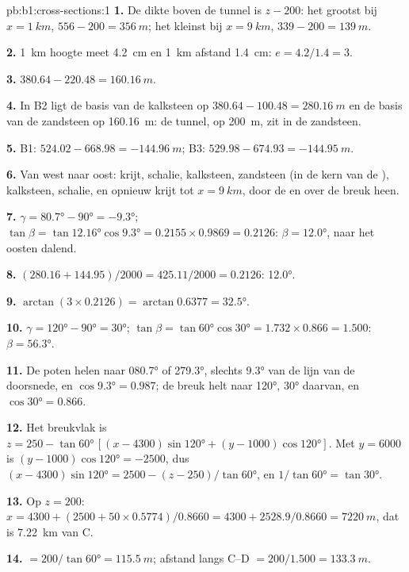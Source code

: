 \begin{solution}{pb:b1:cross-sections:1}
\textbf{1.} De dikte boven de tunnel is $z - 200$: het grootst bij
$x = \qty{1}{km}$, $556 - 200 = \qty{356}{m}$; het kleinst bij $x =
\qty{9}{km}$, $339 - 200 = \qty{139}{m}$.

\textbf{2.} \qty{1}{km} hoogte meet \qty{4.2}{cm} en \qty{1}{km} afstand
\qty{1.4}{cm}: $e = 4.2/1.4 = 3$.

\textbf{3.} $380.64 - 220.48 = \qty{160.16}{m}$.

\textbf{4.} In B2 ligt de basis van de kalksteen op $380.64 - 100.48 =
\qty{280.16}{m}$ en de basis van de zandsteen op \qty{160.16}{m}: de
tunnel, op \qty{200}{m}, zit in de zandsteen.

\textbf{5.} B1: $524.02 - 668.98 = \qty{-144.96}{m}$; B3: $529.98 - 674.93 =
\qty{-144.95}{m}$.

\textbf{6.} Van west naar oost: krijt, schalie, kalksteen, zandsteen (in de kern van de ),
kalksteen, schalie, en opnieuw krijt tot $x = \qty{9}{km}$, door de  en over de breuk heen.

\textbf{7.} $\gamma = \ang{80.7} - \ang{90} = \ang{-9.3}$; $\tan\beta =
\tan\ang{12.16}\cos\ang{9.3} = 0.2155\times0.9869 = 0.2126$: $\beta =
\ang{12.0}$, naar het oosten dalend.

\textbf{8.} $(280.16 + 144.95)/2000 = 425.11/2000 = 0.2126$: \ang{12.0}.

\textbf{9.} $\arctan(3\times0.2126) = \arctan 0.6377 = \ang{32.5}$.

\textbf{10.} $\gamma = \ang{120} - \ang{90} = \ang{30}$; $\tan\beta =
\tan\ang{60}\cos\ang{30} = 1.732\times0.866 = 1.500$: $\beta = \ang{56.3}$.

\textbf{11.} De poten helen naar \ang{080.7} of \ang{279.3}, slechts \ang{9.3} van de lijn van de
doorsnede, en $\cos\ang{9.3} = 0.987$; de breuk helt naar \ang{120}, \ang{30} daarvan, en
$\cos\ang{30} = 0.866$.

\textbf{12.} Het breukvlak is $z = 250 - \tan\ang{60}\,[(x - 4300)
\sin\ang{120} + (y - 1000)\cos\ang{120}]$. Met $y = 6000$ is $(y - 1000)
\cos\ang{120} = -2500$, dus $(x - 4300)\sin\ang{120} = 2500 - (z - 250)/
\tan\ang{60}$, en $1/\tan\ang{60} = \tan\ang{30}$.

\textbf{13.} Op $z = 200$: $x = 4300 + (2500 + 50\times0.5774)/0.8660 =
4300 + 2528.9/0.8660 = \qty{7220}{m}$, dat is \qty{7.22}{km} van C.

\textbf{14.}  $= 200/\tan\ang{60} = \qty{115.5}{m}$; afstand langs
C--D $= 200/1.500 = \qty{133.3}{m}$.


\end{solution}

